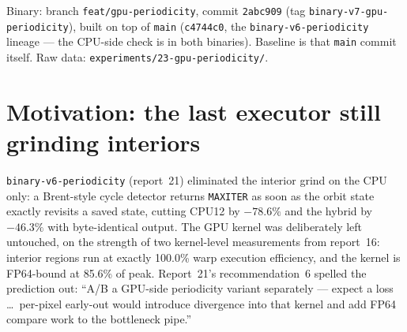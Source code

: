 \documentclass[
	english,
	letterpaper, oneside
]{article}
\begin{document}
\templatePagecfg
\templateFinalcfg

\inserttitle

\begin{center}\small\textsf{%
Binary: branch \texttt{feat/gpu-periodicity}, commit \texttt{2abc909}
(tag \texttt{binary-v7-gpu-periodicity}), built on top of \texttt{main}
(\texttt{c4744c0}, the \texttt{binary-v6-periodicity} lineage --- the CPU-side
check is in both binaries). Baseline is that \texttt{main} commit
itself. Raw data: \texttt{experiments/23-gpu-periodicity/}.%
}\end{center}

\begin{abstract}
This report ports the exact Brent periodicity check of
\texttt{21-periodicity-check.tex} from the CPU \texttt{diverge()} to the CUDA
kernel --- the variant report~21 explicitly deferred with ``expect a loss.''
Measured on the production spec (100 frames, $1920\times1080$,
\texttt{diffT}\,=\,0.1, \texttt{save}\,=\,1, 3 alternating reps with a CPU12
control, on AC): the prediction is falsified. Mix-controlled kernel
time over the identical 5{,}608 regions falls $66.2 \to 28.3$~s
(2.34$\times$), GPU-only wall falls $78.2 \to 40.1$~s ($-48.8\%$),
and the production hybrid falls $29.83 \to 23.72$~s
($-20.5\%$) --- the best wall this project has recorded --- while
all 100 output frames stay byte-identical. The error in the
prediction was its cost model: a warp does not pay $32\times$\texttt{MAXITER}
when lanes diverge at an early exit; it pays the slowest lane's
detection latency, and spatially adjacent lanes detect their cycles at
correlated times. The hybrid self-rebalances a third time (GPU share
$18 \to 54\%$ of regions), the CPU pool stays the binding resource at 20\%
less cost, and the GPU thread's own cost structure inverts: kernel occupancy
drops from 85\% to 45\% of the wall, promoting host-side commit --- report
20's \texttt{scanLine} lever --- to the next target.
\end{abstract}

\section{Motivation: the last executor still grinding interiors}
\label{sec:motivation}

\texttt{binary-v6-periodicity} (report~21) eliminated the interior grind on
the CPU only: a Brent-style cycle detector returns \texttt{MAXITER} as soon
as the orbit state exactly revisits a saved state, cutting CPU12 by
$-78.6\%$ and the hybrid by $-46.3\%$ with byte-identical output. The GPU
kernel was deliberately left untouched, on the strength of two kernel-level
measurements from report~16: interior regions run at exactly 100.0\% warp
execution efficiency, and the kernel is FP64-bound at 85.6\% of peak.
Report~21's recommendation~6 spelled the prediction out: ``A/B a
GPU-side periodicity variant separately --- expect a loss \ldots\ per-pixel
early-out would introduce divergence into that kernel and add FP64 compare
work to the bottleneck pipe.''
\end{document}
